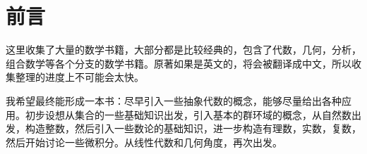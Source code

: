 
\chapter*{前言}
这里收集了大量的数学书籍，大部分都是比较经典的，包含了代数，几何，分析，组合数学等各个分支的数学书籍。原著如果是英文的，将会被翻译成中文，所以收集整理的进度上不可能会太快。

我希望最终能形成一本书：尽早引入一些抽象代数的概念，能够尽量给出各种应用。初步设想从集合的一些基础知识出发，引入基本的群环域的概念，从自然数出发，构造整数，然后引入一些数论的基础知识，进一步构造有理数，实数，复数，然后开始讨论一些微积分。从线性代数和几何角度，再次出发。

